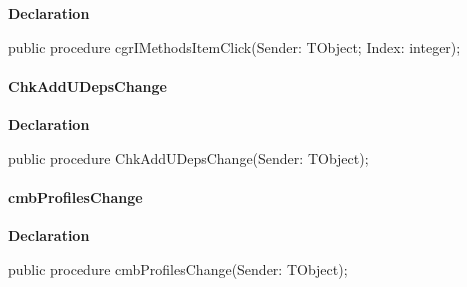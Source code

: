 \documentclass{report}
\newif\ifpdf
\begin{document}
\label{prjwizard.TfrmProjectWizard-cgrIMethodsItemClick}
\begin{list}{}{
\setlength{\itemindent}{0cm}
\setlength{\listparindent}{0cm}
\setlength{\leftmargin}{\evensidemargin}
\addtolength{\leftmargin}{\tmplength}
\settowidth{\labelsep}{X}
\addtolength{\leftmargin}{\labelsep}
\setlength{\labelwidth}{\tmplength}
}
\item[\textbf{Declaration}\hfill]
\ifpdf
\begin{flushleft}
\fi
\begin{ttfamily}
public procedure cgrIMethodsItemClick(Sender: TObject; Index: integer);\end{ttfamily}

\ifpdf
\end{flushleft}
\fi

\end{list}
\paragraph*{ChkAddUDepsChange}\hspace*{\fill}

\label{prjwizard.TfrmProjectWizard-ChkAddUDepsChange}
\begin{list}{}{
\setlength{\itemindent}{0cm}
\setlength{\listparindent}{0cm}
\setlength{\leftmargin}{\evensidemargin}
\addtolength{\leftmargin}{\tmplength}
\settowidth{\labelsep}{X}
\addtolength{\leftmargin}{\labelsep}
\setlength{\labelwidth}{\tmplength}
}
\item[\textbf{Declaration}\hfill]
\ifpdf
\begin{flushleft}
\fi
\begin{ttfamily}
public procedure ChkAddUDepsChange(Sender: TObject);\end{ttfamily}

\ifpdf
\end{flushleft}
\fi

\end{list}
\paragraph*{cmbProfilesChange}\hspace*{\fill}

\label{prjwizard.TfrmProjectWizard-cmbProfilesChange}
\begin{list}{}{
\setlength{\itemindent}{0cm}
\setlength{\listparindent}{0cm}
\setlength{\leftmargin}{\evensidemargin}
\addtolength{\leftmargin}{\tmplength}
\settowidth{\labelsep}{X}
\addtolength{\leftmargin}{\labelsep}
\setlength{\labelwidth}{\tmplength}
}
\item[\textbf{Declaration}\hfill]
\ifpdf
\begin{flushleft}
\fi
\begin{ttfamily}
public procedure cmbProfilesChange(Sender: TObject);\end{ttfamily}

\ifpdf
\end{flushleft}
\fi

\end{list}
\end{document}
